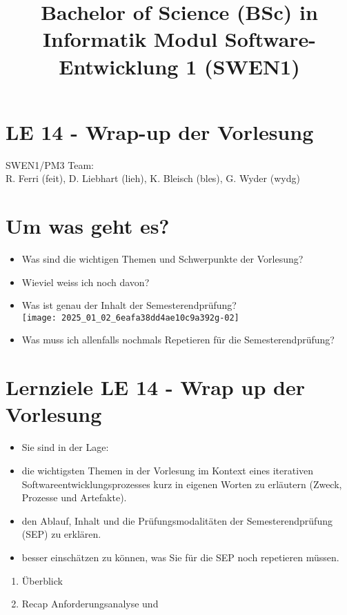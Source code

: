 \documentclass[10pt]{article}
\title{Bachelor of Science (BSc) in Informatik Modul Software-Entwicklung 1 (SWEN1) }
\author{}
\date{}
\begin{document}
\maketitle
\section*{LE 14 - Wrap-up der Vorlesung}
SWEN1/PM3 Team:\\
R. Ferri (feit), D. Liebhart (lieh), K. Bleisch (bles), G. Wyder (wydg)

\section*{Um was geht es?}
\begin{itemize}
  \item Was sind die wichtigen Themen und Schwerpunkte der Vorlesung?
  \item Wieviel weiss ich noch davon?
  \item Was ist genau der Inhalt der Semesterendprüfung?\\
\texttt{[image: 2025\_01\_02\_6eafa38dd4ae10c9a392g-02]}
  \item Was muss ich allenfalls nochmals Repetieren für die Semesterendprüfung?
\end{itemize}

\section*{Lernziele LE 14 - Wrap up der Vorlesung}
\begin{itemize}
  \item Sie sind in der Lage:
  \item die wichtigsten Themen in der Vorlesung im Kontext eines iterativen Softwareentwicklungsprozesses kurz in eigenen Worten zu erläutern (Zweck, Prozesse und Artefakte).
  \item den Ablauf, Inhalt und die Prüfungsmodalitäten der Semesterendprüfung (SEP) zu erklären.
  \item besser einschätzen zu können, was Sie für die SEP noch repetieren müssen.
\end{itemize}

\begin{enumerate}
  \item Überblick
  \item Recap Anforderungsanalyse und
\end{enumerate}
\end{document}
